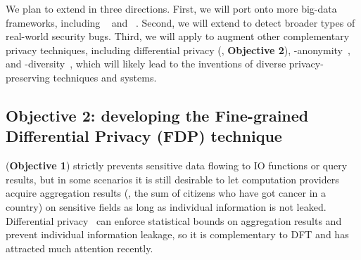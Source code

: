 

 We plan to extend \kakute in 
three directions. First, we will port \kakute onto more big-data frameworks, 
including \pig~\cite{pig:vldb08} and \hadoop~\cite{hadoop}. Second, we will 
extend \kakute to detect broader types of real-world security bugs. Third, we 
will apply \kakute to augment other complementary privacy techniques, including 
differential privacy (\ie, \textbf{Objective 2}),
-anonymity~\cite{kanonymity}, and 
-diversity~\cite{icde06:ldiversity}, which will likely lead to the 
inventions of diverse privacy-preserving techniques and systems. 

\vspace{-.15in}\subsection{Objective 2: developing the Fine-grained 
Differential Privacy (FDP) technique}\label{sec:obj2}\vspace{-.075in}



\kakute (\textbf{Objective 1}) strictly prevents
sensitive data flowing to IO functions or query results, but in some scenarios 
it is still desirable to let computation providers acquire aggregation 
results (\eg, the sum of citizens who have got cancer in a country) 
on sensitive fields as long as individual information is not leaked. 
Differential privacy~\cite{Dwork2006Differential} can enforce statistical 
bounds on 
aggregation results and prevent individual information leakage, so it is 
complementary to DFT and has attracted much attention recently.


